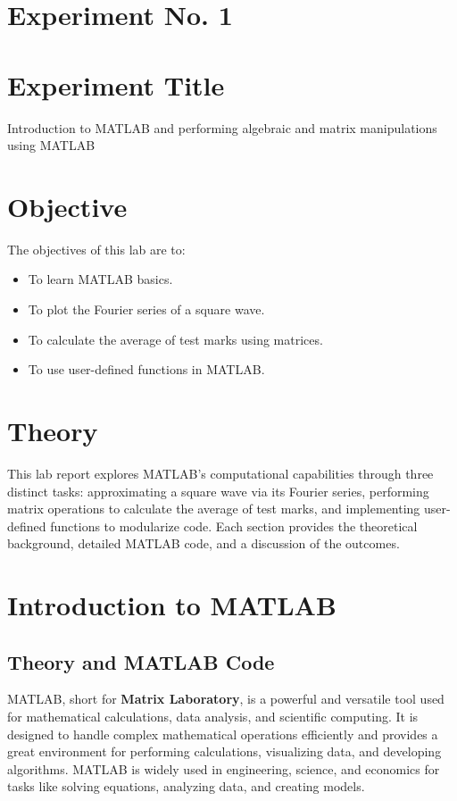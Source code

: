 \documentclass[a4paper,12pt]{article}
\begin{document}
	\section{Experiment No. 1}
	
	\section{Experiment Title }
	Introduction to MATLAB and performing algebraic and matrix manipulations using MATLAB
	\section{Objective}
	
The objectives of this lab are to:
\begin{itemize}
\item To learn MATLAB basics.
\item To plot the Fourier series of a square wave.
\item To calculate the average of test marks using matrices.
\item To use user-defined functions in MATLAB.
\end{itemize}
	\section{Theory}
	




	This lab report explores MATLAB's computational capabilities through three distinct tasks: approximating a square wave via its Fourier series, performing matrix operations to calculate the average of test marks, and implementing user-defined functions to modularize code. Each section provides the theoretical background, detailed MATLAB code, and a discussion of the outcomes.


\section{Introduction to MATLAB}
\subsection{Theory and MATLAB Code}


MATLAB, short for \textbf{Matrix Laboratory}, is a powerful and versatile tool used for mathematical calculations, data analysis, and scientific computing. It is designed to handle complex mathematical operations efficiently and provides a great environment for performing calculations, visualizing data, and developing algorithms. MATLAB is widely used in engineering, science, and economics for tasks like solving equations, analyzing data, and creating models.
\end{document}
